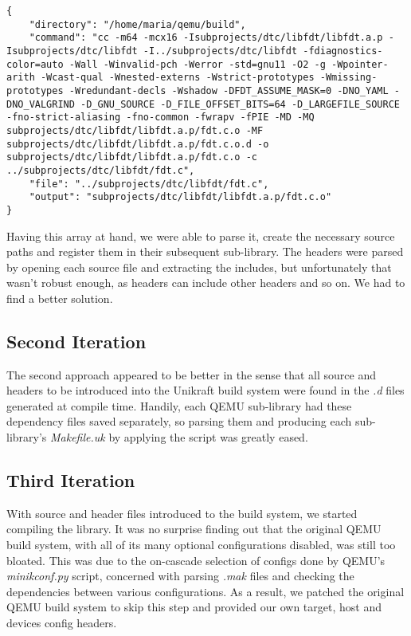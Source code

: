 \begin{lstlisting}
{
    "directory": "/home/maria/qemu/build",
    "command": "cc -m64 -mcx16 -Isubprojects/dtc/libfdt/libfdt.a.p -Isubprojects/dtc/libfdt -I../subprojects/dtc/libfdt -fdiagnostics-color=auto -Wall -Winvalid-pch -Werror -std=gnu11 -O2 -g -Wpointer-arith -Wcast-qual -Wnested-externs -Wstrict-prototypes -Wmissing-prototypes -Wredundant-decls -Wshadow -DFDT_ASSUME_MASK=0 -DNO_YAML -DNO_VALGRIND -D_GNU_SOURCE -D_FILE_OFFSET_BITS=64 -D_LARGEFILE_SOURCE -fno-strict-aliasing -fno-common -fwrapv -fPIE -MD -MQ subprojects/dtc/libfdt/libfdt.a.p/fdt.c.o -MF subprojects/dtc/libfdt/libfdt.a.p/fdt.c.o.d -o subprojects/dtc/libfdt/libfdt.a.p/fdt.c.o -c ../subprojects/dtc/libfdt/fdt.c",
    "file": "../subprojects/dtc/libfdt/fdt.c",
    "output": "subprojects/dtc/libfdt/libfdt.a.p/fdt.c.o"
}
\end{lstlisting}

Having this array at hand, we were able to parse it, create the necessary source paths and register them in their subsequent sub-library.
The headers were parsed by opening each source file and extracting the includes, but unfortunately that wasn't robust enough, as headers can include other headers and so on.
We had to find a better solution.

\subsection{Second Iteration}
\label{subsec:second-iteration}

The second approach appeared to be better in the sense that all source and headers to be introduced into the Unikraft build system were found in the \textit{.d} files generated at compile time.
Handily, each QEMU sub-library had these dependency files saved separately, so parsing them and producing each sub-library's \textit{Makefile.uk} by applying the  script was greatly eased.

\subsection{Third Iteration}
\label{subsec:third-iteration}

With source and header files introduced to the build system, we started compiling the library.
It was no surprise finding out that the original QEMU build system, with all of its many optional configurations disabled, was still too bloated.
This was due to the on-cascade selection of configs done by QEMU's \textit{minikconf.py} script, concerned with parsing \textit{.mak} files and checking the dependencies between various configurations.
As a result, we patched the original QEMU build system to skip this step and provided our own target, host and devices config headers. 

